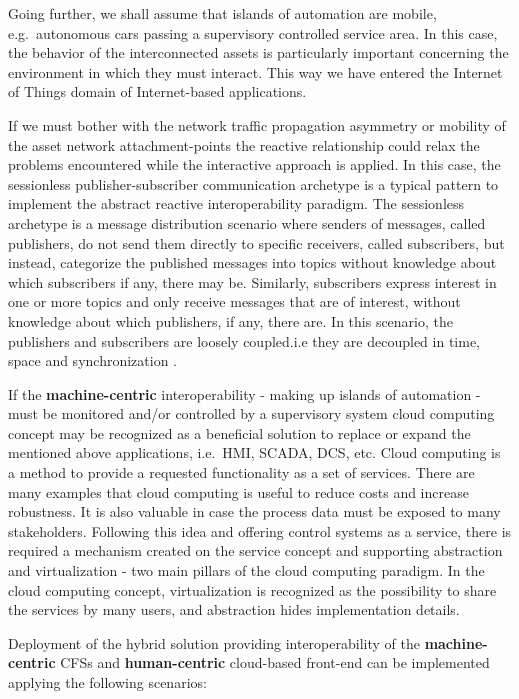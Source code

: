 \documentclass{jacsart}
\begin{document}
Going further, we shall assume that islands of automation are mobile,
e.g.~autonomous cars passing a supervisory controlled service area. In
this case, the behavior of the interconnected assets is particularly
important concerning the environment in which they must interact. This
way we have entered the Internet of Things domain of Internet-based
applications.

If we must bother with the network traffic propagation asymmetry or
mobility of the asset network attachment-points the reactive
relationship could relax the problems encountered while the interactive
approach is applied. In this case, the sessionless publisher-subscriber
communication archetype is a typical pattern to implement the abstract
reactive interoperability paradigm. The sessionless archetype is a
message distribution scenario where senders of messages, called
publishers, do not send them directly to specific receivers, called
subscribers, but instead, categorize the published messages into topics
without knowledge about which subscribers if any, there may be.
Similarly, subscribers express interest in one or more topics and only
receive messages that are of interest, without knowledge about which
publishers, if any, there are. In this scenario, the publishers and
subscribers are loosely coupled.i.e they are decoupled in time, space
and synchronization \cite{RefWorks:doc:5c44e246e4b0591b15ea9e59}.

If the \textbf{machine-centric} interoperability - making up islands of
automation - must be monitored and/or controlled by a supervisory system
cloud computing concept may be recognized as a beneficial solution to
replace or expand the mentioned above applications, i.e.~HMI, SCADA,
DCS, etc. Cloud computing is a method to provide a requested
functionality as a set of services. There are many examples that cloud
computing is useful to reduce costs and increase robustness. It is also
valuable in case the process data must be exposed to many stakeholders.
Following this idea and offering control systems as a service, there is
required a mechanism created on the service concept and supporting
abstraction and virtualization - two main pillars of the cloud computing
paradigm. In the cloud computing concept, virtualization is recognized
as the possibility to share the services by many users, and abstraction
hides implementation details.

Deployment of the hybrid solution providing interoperability of the
\textbf{machine-centric} CFSs and
\textbf{human-centric} cloud-based front-end can be implemented applying
the following scenarios:
\end{document}
